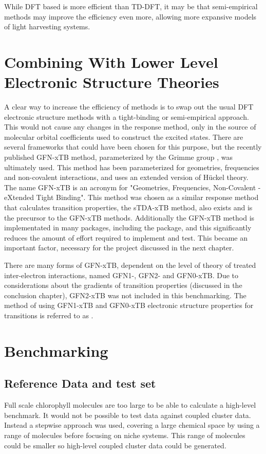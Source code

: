 While DFT based \dscf is more efficient than TD-DFT, it may be that semi-empirical
methods may improve the efficiency even more, allowing more expansive models of 
light harvesting systems.

\section{Combining \dscf With Lower Level Electronic Structure Theories}
\label{sec:dscf_theory}
A clear way to increase the efficiency of \dscf methods is to swap out the usual
DFT electronic structure methods with a tight-binding or semi-empirical approach.
This would not cause any changes in the response method, only in the source of molecular
orbital coefficients used to construct the excited states. There are several frameworks 
that could have been chosen for this purpose, but the recently published GFN-xTB
method, parameterized by the Grimme group \cite{Grimme2017}, was ultimately used.
This method has been parameterized for geometries, frequencies and non-covalent 
interactions, and uses an extended version of H{\"u}ckel theory. The name GFN-xTB
is an acronym for "Geometries, Frequencies, Non-Covalent - eXtended Tight Binding".
This method was chosen as a similar response method that calculates transition 
properties, the sTDA-xTB method, also exists and is the precursor to the GFN-xTB methods.
Additionally the GFN-xTB method is implementated in many packages, including the
 package, and this significantly reduces the amount of effort required to
implement and test. This became an important factor, necessary for the project 
discussed in the next chapter.

There are many forms of GFN-xTB, dependent on the level of theory of treated inter-electron
interactions, named GFN1-, GFN2- and GFN0-xTB. Due to considerations about the gradients 
of transition properties (discussed in the conclusion chapter), GFN2-xTB was not
included in this benchmarking. The method of using GFN1-xTB and GFN0-xTB electronic 
structure properties for \dscf transitions is referred to as \dxtb.

\section{Benchmarking \dscf}
\label{sec:benchmarking}
\subsection{Reference Data and test set}
\label{subsec:reference_data}
Full scale chlorophyll molecules are too large to be able to calculate a high-level
benchmark. It would not be possible to test \dscf data against coupled cluster data.
Instead a stepwise approach was used, covering a large chemical space by using a
range of molecules before focusing on niche systems. This range of molecules could
be smaller so high-level coupled cluster data could be generated.

